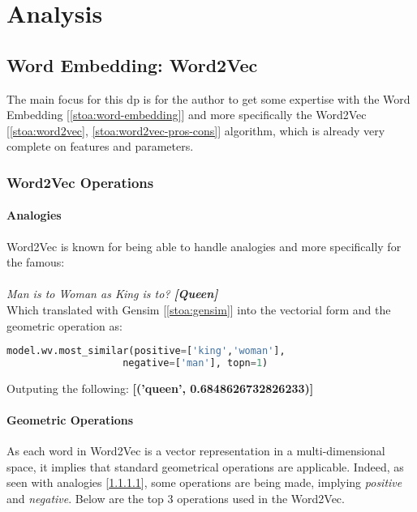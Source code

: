 \chapter{Analysis}
\label{chap:analysis}
\section{Word Embedding: Word2Vec}
The main focus for this \gls{dp} is for the author to get some expertise with the Word Embedding [\ref{stoa:word-embedding}] and more specifically the Word2Vec [\ref{stoa:word2vec}, \ref{stoa:word2vec-pros-cons}] algorithm, which is already very complete on features and parameters\cite{article:word2vec-parameters}.



\subsection{Word2Vec Operations}
\subsubsection{Analogies}
\label{analyse:analogies}

Word2Vec is known for being able to handle analogies and more specifically for the famous:\\\\ \textit{Man is to Woman as King is to? \textbf{[Queen]}}\\ 

Which translated with Gensim [\ref{stoa:gensim}] into the vectorial form and the geometric operation as:
\begin{lstlisting}[language=Python]
model.wv.most_similar(positive=['king','woman'],
                    negative=['man'], topn=1)
\end{lstlisting}

Outputing the following: \textbf{[('queen', 0.6848626732826233)]}

\subsubsection{Geometric Operations}
\label{analyse:geometric-operations}
As each word in Word2Vec is a vector representation in a multi-dimensional space, it implies that standard geometrical operations are applicable. Indeed, as seen with analogies [\ref{analyse:analogies}], some operations are being made, implying \textit{positive} and \textit{negative}. Below are the top 3 operations used in the Word2Vec.

